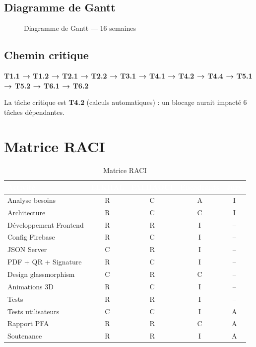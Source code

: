 \subsection{Diagramme de Gantt}

\begin{figure}[H]
\centering
{}
\caption{Diagramme de Gantt — 16 semaines}
\label{fig:gantt}
\end{figure}

\subsection{Chemin critique}

\textbf{T1.1 → T1.2 → T2.1 → T2.2 → T3.1 → T4.1 → T4.2 → T4.4 → T5.1 → T5.2 → T6.1 → T6.2}

La tâche critique est \textbf{T4.2} (calculs automatiques) : un blocage aurait impacté 6 tâches dépendantes.

\section{Matrice RACI}

\begin{table}[H]
\centering
\caption{Matrice RACI}
\label{tab:raci}
\begin{tabularx}{\textwidth}{|X|c|c|c|c|}
\hline
\rowcolor{emsiblue}\textcolor{white}{\textbf{Activité}} & \textcolor{white}{\textbf{ELKHAL}} & \textcolor{white}{\textbf{FALHAOUI}} & \textcolor{white}{\textbf{Encadrants}} & \textcolor{white}{\textbf{Jury}} \\
\hline
Analyse besoins & R & C & A & I \\
Architecture & R & C & C & I \\
Développement Frontend & R & R & I & -- \\
Config Firebase & R & C & I & -- \\
JSON Server & C & R & I & -- \\
PDF + QR + Signature & R & C & I & -- \\
Design glassmorphism & C & R & C & -- \\
Animations 3D & R & C & I & -- \\
Tests & R & R & I & -- \\
Tests utilisateurs & C & C & I & A \\
Rapport PFA & R & R & C & A \\
Soutenance & R & R & I & A \\
\hline
\end{tabularx}
\end{table}

